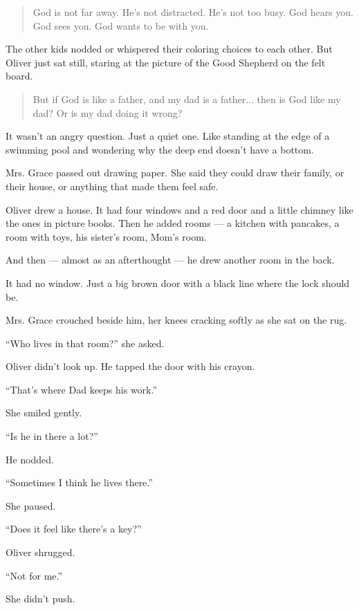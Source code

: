 \begin{quote}
God is not far away. He’s not distracted. He’s not too busy. God hears you. God sees you. God wants to 
be with you.
\end{quote}

The other kids nodded or whispered their coloring choices to each other. But Oliver just sat still, 
staring at the picture of the Good Shepherd on the felt board.

\medskip

\begin{quote}
But if God is like a father, and my dad is a father...
then is God like my dad?
Or is my dad doing it wrong?
\end{quote}

\medskip

It wasn’t an angry question. Just a quiet one. Like standing at the edge of a swimming pool and 
wondering why the deep end doesn’t have a bottom.

Mrs. Grace passed out drawing paper. She said they could draw their family, or their house, or anything 
that made them feel safe.

Oliver drew a house. It had four windows and a red door and a little chimney like the ones in picture 
books. Then he added rooms — a kitchen with pancakes, a room with toys, his sister’s room, Mom’s room.

And then --- almost as an afterthought --- he drew another room in the back.

It had no window. Just a big brown door with a black line where the lock should be.

Mrs. Grace crouched beside him, her knees cracking softly as she sat on the rug.

``Who lives in that room?'' she asked.

Oliver didn’t look up. He tapped the door with his crayon.

``That’s where Dad keeps his work.''

She smiled gently.

``Is he in there a lot?''

He nodded.

``Sometimes I think he lives there.''

She paused.

``Does it feel like there’s a key?''

Oliver shrugged.

``Not for me.''

She didn’t push.


